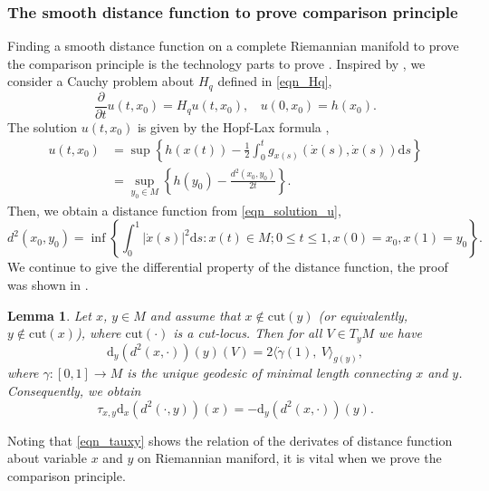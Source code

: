 \documentclass[a4paper]{article}
\numberwithin{equation}{section}
\newtheorem{lemma}[theorem]{Lemma}
\theoremstyle{definition}
\begin{document}
\subsubsection{The smooth distance function to prove comparison principle}
Finding a smooth distance function on a complete Riemannian manifold to prove the comparison principle is the technology parts to prove . Inspired by \cite{FK2006}, we consider a Cauchy problem about $H_q$ defined in \eqref{eqn_Hq},
\begin{equation*}
    \frac{\partial}{\partial t}u(t,x_0)=H_qu(t,x_0),~~~~u(0,x_0)=h(x_0).
\end{equation*}
The solution $u(t,x_0)$ is given by the Hopf-Lax formula \cite[Proposition 9.4.1]{BGL2014MR3155209},
\begin{equation}\label{eqn_solution_u}
\begin{split}
u(t,x_0)&=\sup\left\{h(x(t))-\frac{1}{2}\int^t_0 g_{x(s)}(\dot{x}(s),\dot{x}(s))\mathrm{d}s\right\}\\
    &=\sup_{y_0\in M}\left\{h(y_0)-\frac{d^2(x_0,y_0)}{2t}\right\}.
\end{split}
\end{equation}
Then, we obtain a  distance function from \eqref{eqn_solution_u}, 
\begin{equation}\label{eqn_distance_function}
    d^2(x_0,y_0)=\inf\left\{\int^1_0 |\dot{x}(s)|^2\mathrm{d}s:x(t)\in M; 0\leq t\leq 1, x(0)=x_0,x(1)=y_0\right\}.
\end{equation}
 We continue to give the differential property of the distance function, the proof was shown in \cite[Appendix C.1]{KRV2019}.
\begin{lemma}\label{lem_dddd}
    Let $x$, $y\in M$ and assume that $x\notin \mbox{cut}(y)$ (or equivalently, $y\notin \mbox{cut}(x)$), where $\mbox{cut}(\cdot)$ is a cut-locus. Then for all $V\in T_yM$ we have
    \begin{equation*}
		\mathrm{d}_y(d^2(x,\cdot))(y)(V)=2\langle \dot{\gamma}(1),~V
\rangle_{g(y)},    
\end{equation*}
where $\gamma: [0,1]\to M$ is the unique geodesic of minimal length connecting $x$ and $y$. Consequently, we obtain
\begin{equation}\label{eqn_tauxy}
   \tau_{x,y} \mathrm{d}_x(d^2(\cdot,y))(x)=-\mathrm{d}_y(d^2(x,\cdot))(y).
\end{equation}
\end{lemma}
Noting that \eqref{eqn_tauxy} shows the relation of the derivates of distance function about variable $x$ and $y$ on Riemannian maniford, it is vital when we prove the comparison principle.
\end{document}
